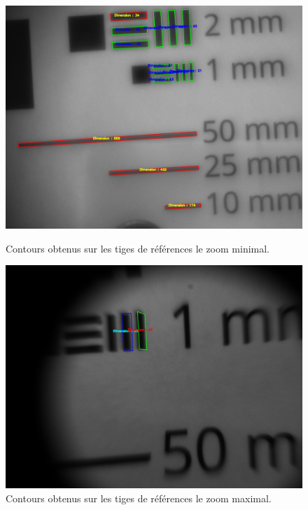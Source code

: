 \documentclass[11pt,letterpaper]{article}
\begin{document}
\begin{figure}[H]
    \centering
    \begin{minipage}[t]{0.46\linewidth}
        \centering
        \includegraphics[scale=0.15]{rectangles_detectes_min.png}
        \caption{Contours obtenus sur les tiges de références le zoom minimal.}
        \label{detec_min}
    \end{minipage}\hfill
    \begin{minipage}[t]{0.48\linewidth}
        \centering
        \includegraphics[scale=0.15]{rectangles_detectes_max.png}
        \caption{Contours obtenus sur les tiges de références le zoom maximal.}
        \label{detec_max}
    \end{minipage}
\end{figure}
\end{document}

